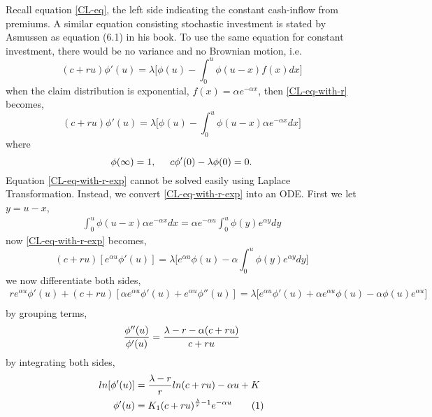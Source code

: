 \documentclass[12pt]{article}
\newcommand\numberthis{\addtocounter{equation}{1}\tag{\theequation}}
\begin{document}
Recall equation \eqref{CL-eq}, the left side indicating the constant cash-inflow from premiums. A similar equation consisting stochastic investment is stated by Asmussen as equation (6.1) in his book\cite{ref01}. To use the same equation for constant investment, there would be no variance and no Brownian motion, i.e. 
\begin{equation}\label{CL-eq-with-r}
    (c+ru)\phi'(u)=\lambda\Big[\phi(u)-\int_{0}^{u}\phi(u-x)f(x)dx\Big]
\end{equation}
when the claim distribution is exponential, $f(x)=\alpha e^{-\alpha x}$, then \eqref{CL-eq-with-r} becomes,
\begin{equation}\label{CL-eq-with-r-exp}
    (c+ru)\phi'(u)=\lambda\Big[\phi(u)-\int_{0}^{u}\phi(u-x)\alpha e^{-\alpha x}dx\Big]
\end{equation}
where
\begin{equation}\label{exp_inv_IC}
    \phi(\infty)=1,
    \hspace{0.5cm}
    c\phi'(0)-\lambda\phi(0)=0.
\end{equation}
Equation \eqref{CL-eq-with-r-exp} cannot be solved easily using Laplace Transformation. Instead, we convert \eqref{CL-eq-with-r-exp} into an ODE. First we let $y=u-x$, \\
\begin{align*}
    \int_{0}^{u}\phi(u-x)\alpha e^{-\alpha x}dx= \alpha e^{-\alpha u} \int_{0}^{u}\phi(y)e^{\alpha y}dy
\end{align*}
now \eqref{CL-eq-with-r-exp} becomes,
\begin{equation}\label{exp_inv_integro_differential}
    (c+ru)[e^{\alpha u}\phi'(u)]=\lambda\Big[e^{\alpha u}\phi(u)-\alpha\int_{0}^{u}\phi(y)e^{\alpha y}dy\Big]
\end{equation}
we now differentiate both sides,
\begin{align*}
    re^{\alpha u}\phi'(u)+(c+ru)[\alpha e^{\alpha u}\phi'(u)+e^{\alpha u}\phi''(u)]=\lambda\Big[e^{\alpha u}\phi'(u)+\alpha e^{\alpha u}\phi(u)-\alpha\phi(u)e^{\alpha u}\Big]\\
\end{align*}
by grouping terms,
\begin{equation}
    \frac{\phi''(u)}{\phi'(u)}=\frac{\lambda-r-\alpha(c+ru)}{c+ru}\\
\end{equation}
by integrating both sides,
\begin{align*}
    ln[\phi'(u)]&=\frac{\lambda-r}{r}ln(c+ru)-\alpha u+K\\
    \phi'(u)&=K_1(c+ru)^{\frac{\lambda}{r}-1}e^{-\alpha u}\numberthis \label{exp_inv_differential}
\end{align*}
\end{document}
